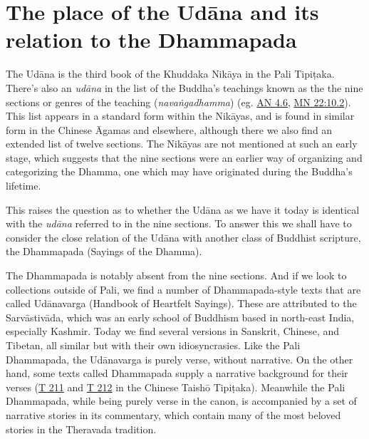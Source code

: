 \documentclass[12pt,openany]{book}%
\begin{document}
\section*{The place of the \textsanskrit{Udāna} and its relation to the Dhammapada}

The \textsanskrit{Udāna} is the third book of the Khuddaka \textsanskrit{Nikāya} in the Pali \textsanskrit{Tipiṭaka}. There’s also an \textit{\textsanskrit{udāna}} in the list of the Buddha’s teachings known as the the nine sections or genres of the teaching (\textit{\textsanskrit{navaṅgadhamma}}) (eg. \href{https://suttacentral.net/an4.6/en/sujato}{AN 4.6}, \href{https://suttacentral.net/mn22/en/sujato\#10.2}{MN  22:10.2}). This list appears in a standard form within the \textsanskrit{Nikāyas}, and is found in similar form in the Chinese Āgamas and elsewhere, although there we also find an extended list of twelve sections. The \textsanskrit{Nikāyas} are not mentioned at such an early stage, which suggests that the nine sections were an earlier way of organizing and categorizing the Dhamma, one which may have originated during the Buddha’s lifetime. 

This raises the question as to whether the \textsanskrit{Udāna} as we have it today is identical with the \textit{\textsanskrit{udāna}} referred to in the nine sections. To answer this we shall have to consider the close relation of the \textsanskrit{Udāna} with another class of Buddhist scripture, the Dhammapada (Sayings of the Dhamma). 

The Dhammapada is notably absent from the nine sections. And if we look to collections outside of Pali, we find a number of Dhammapada-style texts that are called \textsanskrit{Udānavarga} (Handbook of Heartfelt Sayings). These are attributed to the \textsanskrit{Sarvāstivāda}, which was an early school of Buddhism based in north-east India, especially Kashmir. Today we find several versions in Sanskrit, Chinese, and Tibetan, all similar but with their own idiosyncrasies. Like the Pali Dhammapada, the \textsanskrit{Udānavarga} is purely verse, without narrative. On the other hand, some texts called Dhammapada supply a narrative background for their verses (\href{https://suttacentral.net/t211}{T 211} and \href{https://suttacentral.net/t212}{T 212} in the Chinese Taishō \textsanskrit{Tipiṭaka}). Meanwhile the Pali Dhammapada, while being purely verse in the canon, is accompanied by a set of narrative stories in its commentary, which contain many of the most beloved stories in the Theravada tradition.
\end{document}
